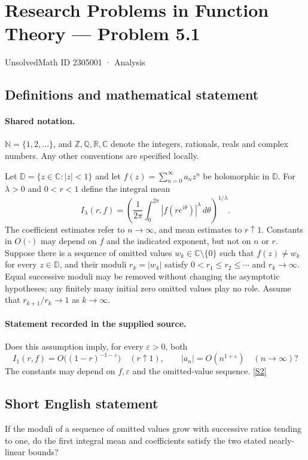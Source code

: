 \documentclass[11pt]{book}
\newcommand{\sref}[2]{\hyperlink{source:#1:#2}{[S#2]}}
\begin{document}
\setcounter{section}{2305000}
\section{Research Problems in Function Theory — Problem 5.1}\label{2305001}
{\small\sffamily UnsolvedMath ID 2305001 · Analysis}
\subsection{Definitions and mathematical statement}

\paragraph{Shared notation.}$\mathbb N=\{1,2,\ldots\}$, and $\mathbb Z,\mathbb Q,\mathbb R,\mathbb C$ denote the integers, rationals, reals and complex numbers. Any other conventions are specified locally.


Let $\mathbb D=\{z\in\mathbb C:|z|<1\}$ and let $f(z)=\sum_{n=0}^\infty a_nz^n$ be holomorphic in $\mathbb D$. For $\lambda>0$ and $0<r<1$ define the integral mean
\[I_\lambda(r,f)=\left(\frac1{2\pi}\int_0^{2\pi}|f(re^{i\theta})|^\lambda\,d\theta\right)^{1/\lambda}.
\]
The coefficient estimates refer to $n\to\infty$, and mean estimates to $r\uparrow1$. Constants in $O(\cdot)$ may depend on $f$ and the indicated exponent, but not on $n$ or $r$.
Suppose there is a sequence of omitted values $w_k\in\mathbb C\setminus\{0\}$ such that $f(z)\ne w_k$ for every $z\in\mathbb D$, and their moduli $r_k=|w_k|$ satisfy $0<r_1\le r_2\le\cdots$ and $r_k\to\infty$. Equal successive moduli may be removed without changing the asymptotic hypotheses; any finitely many initial zero omitted values play no role. Assume that $r_{k+1}/r_k\to1$ as $k\to\infty$.
\paragraph{Statement recorded in the supplied source.}
Does this assumption imply, for every $\varepsilon>0$, both
\[I_1(r,f)=O\bigl((1-r)^{-1-\varepsilon}\bigr)\quad(r\uparrow1),\qquad |a_n|=O(n^{1+\varepsilon})\quad(n\to\infty)?\]
The constants may depend on $f,\varepsilon$ and the omitted-value sequence. \sref{2305001}{2}
\subsection{Short English statement}
If the moduli of a sequence of omitted values grow with successive ratios tending to one, do the first integral mean and coefficients satisfy the two stated nearly-linear bounds?
\end{document}
